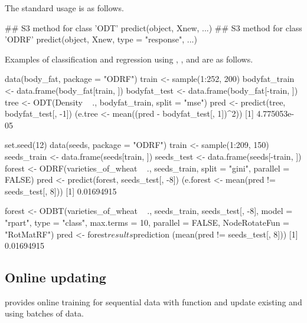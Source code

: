 The standard usage is as follows.
\begin{example}
## S3 method for class 'ODT'
predict(object, Xnew,  ...)
## S3 method for class 'ODRF'
predict(object, Xnew, type = "response", ...)
\end{example}
%
Examples of classification and regression using , , and  are as follows.
%
%
%
\begin{example}
data(body_fat, package = "ODRF")
train <- sample(1:252, 200)
bodyfat_train <- data.frame(body_fat[train, ])
bodyfat_test <- data.frame(body_fat[-train, ])
tree <- ODT(Density ~ ., bodyfat_train, split = "mse")
pred <- predict(tree, bodyfat_test[, -1])
(e.tree <- mean((pred - bodyfat_test[, 1])^2))
[1] 4.775053e-05
\end{example}
\begin{example}
set.seed(12)
data(seeds, package = "ODRF")
train <- sample(1:209, 150)
seeds_train <- data.frame(seeds[train, ])
seeds_test <- data.frame(seeds[-train, ])
forest <- ODRF(varieties_of_wheat ~ ., seeds_train, split = "gini", parallel = FALSE)
pred <- predict(forest, seeds_test[, -8])
(e.forest <- mean(pred != seeds_test[, 8]))
[1] 0.01694915
\end{example}
\begin{example}
forest <- ODBT(varieties_of_wheat ~ ., seeds_train, seeds_test[, -8], model = "rpart",
 type = "class", max.terms = 10, parallel = FALSE, NodeRotateFun = "RotMatRF")
pred <- forest$results$prediction
(mean(pred != seeds_test[, 8]))
[1] 0.01694915
\end{example}

\subsection{Online updating}

 provides  online  training for sequential data with function  and update existing  and  using batches of data. 

